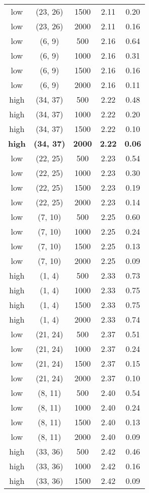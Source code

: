 \begin{tabular}{c c c c c}
low & (23, 26) &  1500 & 2.11 & 0.20 \\
low & (23, 26) &  2000 & 2.11 & 0.16 \\
low & (6, 9) &  500 & 2.16 & 0.64 \\
low & (6, 9) &  1000 & 2.16 & 0.31 \\
low & (6, 9) &  1500 & 2.16 & 0.16 \\
low & (6, 9) &  2000 & 2.16 & 0.11 \\
high & (34, 37) &  500 & 2.22 & 0.48 \\
high & (34, 37) &  1000 & 2.22 & 0.20 \\
high & (34, 37) &  1500 & 2.22 & 0.10 \\
\textbf{high} & \textbf{(34, 37)} & \textbf{ 2000} & \textbf{2.22} & \textbf{0.06} \\
low & (22, 25) &  500 & 2.23 & 0.54 \\
low & (22, 25) &  1000 & 2.23 & 0.30 \\
low & (22, 25) &  1500 & 2.23 & 0.19 \\
low & (22, 25) &  2000 & 2.23 & 0.14 \\
low & (7, 10) &  500 & 2.25 & 0.60 \\
low & (7, 10) &  1000 & 2.25 & 0.24 \\
low & (7, 10) &  1500 & 2.25 & 0.13 \\
low & (7, 10) &  2000 & 2.25 & 0.09 \\
high & (1, 4) &  500 & 2.33 & 0.73 \\
high & (1, 4) &  1000 & 2.33 & 0.75 \\
high & (1, 4) &  1500 & 2.33 & 0.75 \\
high & (1, 4) &  2000 & 2.33 & 0.74 \\
low & (21, 24) &  500 & 2.37 & 0.51 \\
low & (21, 24) &  1000 & 2.37 & 0.24 \\
low & (21, 24) &  1500 & 2.37 & 0.15 \\
low & (21, 24) &  2000 & 2.37 & 0.10 \\
low & (8, 11) &  500 & 2.40 & 0.54 \\
low & (8, 11) &  1000 & 2.40 & 0.24 \\
low & (8, 11) &  1500 & 2.40 & 0.13 \\
low & (8, 11) &  2000 & 2.40 & 0.09 \\
high & (33, 36) &  500 & 2.42 & 0.46 \\
high & (33, 36) &  1000 & 2.42 & 0.16 \\
high & (33, 36) &  1500 & 2.42 & 0.09 \\

\end{tabular}
